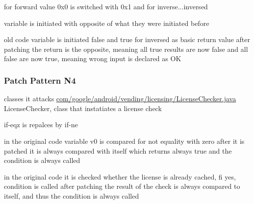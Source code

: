 for forward value 0x0 is switched with 0x1 and for inverse...inversed



variable is initiated with opposite of what they were initiated before




old code variable is initiated false and true for inversed as basic return value
after patching the return is the opposite, meaning all true results are now false and all false are now true, meaning wrong input is declared as OK
\subsubsection{Patch Pattern N4}

classes it attacks %
\url{com/google/android/vending/licensing/LicenseChecker.java}
LicenseChecker, class that instatiates a license check\cite{developersLicensingReference}



if-eqz is repalces by if-ne


in the original code variable v0 is compared for not equality with zero
after it is patched it is always compared with itself which returns always true and the condition is always called



in the original code it is checked whether the license is already cached, fi yes, condition is called
after patching the result of the check is always compared to itself, and thus  the condition is always called
